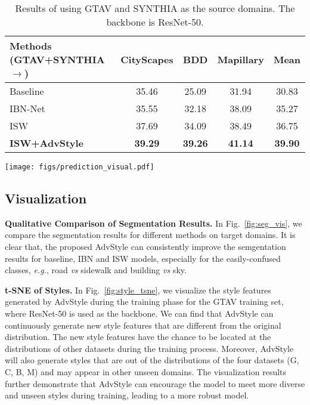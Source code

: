 \documentclass{article}
\newcommand{\ours}{AdvStyle\xspace}
\begin{document}
\begin{table}[t]
\centering
\footnotesize
\caption{Results of using GTAV and SYNTHIA as the source domains. The backbone is ResNet-50.}
\setlength{\tabcolsep}{3pt}
\begin{tabular}{l|c|c|c|c}
\toprule
Methods (GTAV+SYNTHIA$\rightarrow$) & \multicolumn{1}{c|}{CityScapes} & \multicolumn{1}{c|}{BDD} & \multicolumn{1}{c|}{Mapillary} & \multicolumn{1}{c}{Mean}\\
\midrule
{\cellcolor[gray]{1}}Baseline~\cite{robustnet} & 35.46  & 25.09& 31.94  & 30.83 \\
{\cellcolor[gray]{1}}IBN-Net~\cite{ibn}& 35.55  & 32.18 & 38.09   &35.27\\
{\cellcolor[gray]{1}}ISW~\cite{robustnet}& 37.69  & 34.09& 38.49 &36.75 \\
\midrule
{\cellcolor[gray]{1}}\textbf{ISW+AdvStyle} &\bf 39.29 & \bf 39.26& \bf 41.14& \bf 39.90\\
\bottomrule
\end{tabular}
\label{table:multi-source}
\end{table}


\begin{figure*}[!t]
\centering
\texttt{[image: figs/prediction\_visual.pdf]}
\caption{Qualitative comparison of segmentation results. Source: GTAV; Backbone: ResNet-50.}
\label{fig:seg_vis}
\end{figure*}





\subsection{Visualization}

\textbf{Qualitative Comparison of Segmentation Results.} In Fig.~\ref{fig:seg_vis}, we compare the segmentation  results  for different methods on target domains. It is clear that, the proposed \ours can consistently improve the semgentation results for baseline, IBN and ISW models, especially for the easily-confused classes, \textit{e.g.}, road \textit{vs} sidewalk and building \textit{vs} sky. 


\textbf{t-SNE of Styles.} In Fig.~\ref{fig:style_tsne}, we visualize the style features generated by \ours during the training phase for the GTAV training set, where ResNet-50 is used as the backbone. 
{We can find that AdvStyle can continuously generate new style features that are different from the original distribution. The new style features have the chance to be located at the distributions of other datasets during the training process.
Moreover, \ours will also generate styles that are out of the distributions of the four datasets (G, C, B, M) and may appear in other unseen domains.}
The visualization results further demonstrate that \ours can encourage the model to meet more diverse and unseen styles during training, leading to a more robust model.
\end{document}
